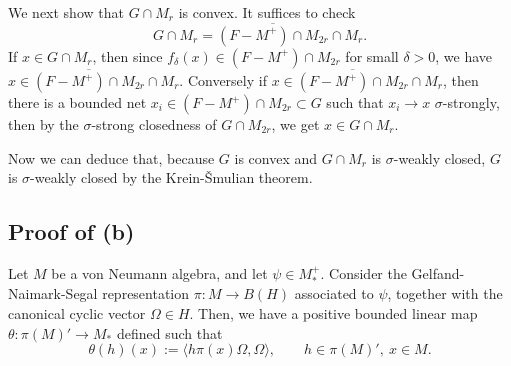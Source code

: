 \documentclass{../../../../small}
\begin{document}
\begin{pf}
We next show that $G\cap M_r$ is convex.
It suffices to check
\[G\cap M_r=\overline{(F-M^+)\cap M_{2r}}\cap M_r.\]
If $x\in G\cap M_r$, then since $f_\delta(x)\in(F-M^+)\cap M_{2r}$ for small $\delta>0$, we have $x\in\overline{(F-M^+)\cap M_{2r}}\cap M_r$.
Conversely if $x\in\overline{(F-M^+)\cap M_{2r}}\cap M_r$, then there is a bounded net $x_i\in(F-M^+)\cap M_{2r}\subset G$ such that $x_i\to x$ $\sigma$-strongly, then by the $\sigma$-strong closedness of $G\cap M_{2r}$, we get $x\in G\cap M_r$.

Now we can deduce that, because $G$ is convex and $G\cap M_r$ is $\sigma$-weakly closed, $G$ is $\sigma$-weakly closed by the Krein-\v Smulian theorem.
\end{pf}


\subsection{Proof of (b)}


\begin{defn*}
Let $M$ be a von Neumann algebra, and let $\psi\in M_*^+$.
Consider the Gelfand-Naimark-Segal representation $\pi:M\to B(H)$ associated to $\psi$, together with the canonical cyclic vector $\Omega\in H$.
Then, we have a positive bounded linear map $\theta:\pi(M)'\to M_*$ defined such that
\[\theta(h)(x):=\langle h\pi(x)\Omega,\Omega\rangle,\qquad h\in\pi(M)',\ x\in M.\]
\end{defn*}
\end{document}
